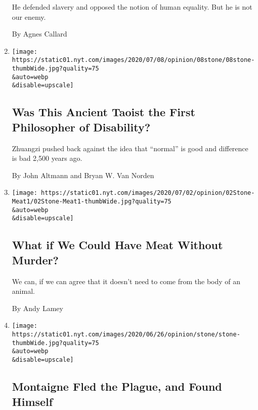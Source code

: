 \begin{enumerate}
  He defended slavery and opposed the notion of human equality. But he
  is not our enemy.

  By Agnes Callard
\item
  \href{/2020/07/08/opinion/disability-philosophy-zhuangzi.html}{}

  \texttt{[image: https://static01.nyt.com/images/2020/07/08/opinion/08stone/08stone-thumbWide.jpg?quality=75\\\&auto=webp\\\&disable=upscale]}

  \hypertarget{was-this-ancient-taoist-the-first-philosopher-of-disability}{%
  \subsection{Was This Ancient Taoist the First Philosopher of
  Disability?}\label{was-this-ancient-taoist-the-first-philosopher-of-disability}}

  Zhuangzi pushed back against the idea that ``normal'' is good and
  difference is bad 2,500 years ago.

  By John Altmann and Bryan W. Van Norden
\item
  \href{/2020/07/02/opinion/lab-grown-meat.html}{}

  \texttt{[image: https://static01.nyt.com/images/2020/07/02/opinion/02Stone-Meat1/02Stone-Meat1-thumbWide.jpg?quality=75\\\&auto=webp\\\&disable=upscale]}

  \hypertarget{what-if-we-could-have-meat-without-murder}{%
  \subsection{What if We Could Have Meat Without
  Murder?}\label{what-if-we-could-have-meat-without-murder}}

  We can, if we can agree that it doesn't need to come from the body of
  an animal.

  By Andy Lamey
\item
  \href{/2020/06/28/opinion/montaigne-plague-essays.html}{}

  \texttt{[image: https://static01.nyt.com/images/2020/06/26/opinion/stone/stone-thumbWide.jpg?quality=75\\\&auto=webp\\\&disable=upscale]}

  \hypertarget{montaigne-fled-the-plague-and-found-himself}{%
  \subsection{Montaigne Fled the Plague, and Found
  Himself}\label{montaigne-fled-the-plague-and-found-himself}}


\end{enumerate}
